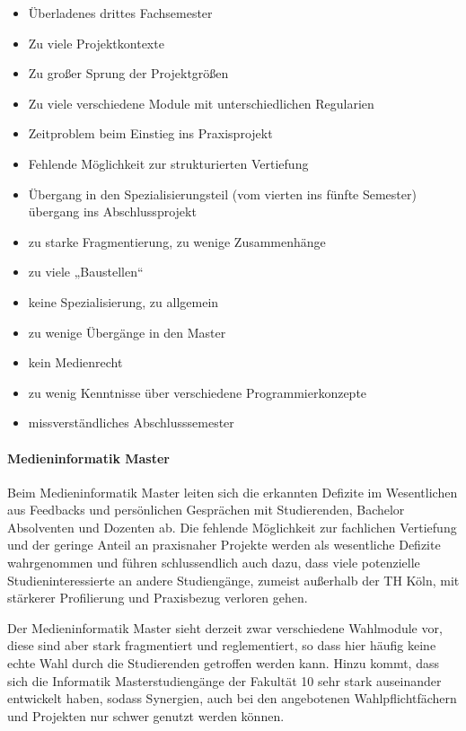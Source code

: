 \begin{itemize}
\tightlist
\item
  Überladenes drittes Fachsemester
\item
  Zu viele Projektkontexte
\item
  Zu großer Sprung der Projektgrößen
\item
  Zu viele verschiedene Module mit unterschiedlichen Regularien
\item
  Zeitproblem beim Einstieg ins Praxisprojekt
\item
  Fehlende Möglichkeit zur strukturierten Vertiefung
\item
  Übergang in den Spezialisierungsteil (vom vierten ins fünfte Semester)
  übergang ins Abschlussprojekt
\item
  zu starke Fragmentierung, zu wenige Zusammenhänge
\item
  zu viele „Baustellen``
\item
  keine Spezialisierung, zu allgemein
\item
  zu wenige Übergänge in den Master
\item
  kein Medienrecht
\item
  zu wenig Kenntnisse über verschiedene Programmierkonzepte
\item
  missverständliches Abschlusssemester
\end{itemize}

\paragraph{Medieninformatik Master}\label{medieninformatik-master}

Beim Medieninformatik Master leiten sich die erkannten Defizite im
Wesentlichen aus Feedbacks und persönlichen Gesprächen mit Studierenden,
Bachelor Absolventen und Dozenten ab. Die fehlende Möglichkeit zur
fachlichen Vertiefung und der geringe Anteil an praxisnaher Projekte
werden als wesentliche Defizite wahrgenommen und führen schlussendlich
auch dazu, dass viele potenzielle Studieninteressierte an andere
Studiengänge, zumeist außerhalb der TH Köln, mit stärkerer Profilierung
und Praxisbezug verloren gehen.

Der Medieninformatik Master sieht derzeit zwar verschiedene Wahlmodule
vor, diese sind aber stark fragmentiert und reglementiert, so dass hier
häufig keine echte Wahl durch die Studierenden getroffen werden kann.
Hinzu kommt, dass sich die Informatik Masterstudiengänge der Fakultät 10
sehr stark auseinander entwickelt haben, sodass Synergien, auch bei den
angebotenen Wahlpflichtfächern und Projekten nur schwer genutzt werden
können.

